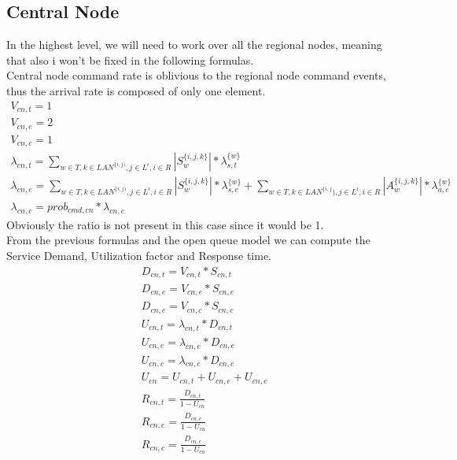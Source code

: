 \documentclass[11pt]{article}
\begin{document}
\subsection{Central Node}
In the highest level, we will need to work over all the regional nodes, meaning that also i won't be fixed in the following formulas.\\
Central node command rate is oblivious to the regional node command events, thus the arrival rate is composed of only one element.
\begin{equation}
	\begin{array}{l}
		V_{cn, t} = 1 \\
		V_{cn, e} = 2 \\ %
		V_{cn,c} = 1 \\
        \lambda_{cn, t} = \sum\limits_{w \in T,k \in LAN^{\{i,j)},j \in L^i, i \in R}{| S^{\{i,j,k\}}_{w} | * \lambda^{\{w\}}_{s, t}}  \\
        \lambda_{cn, e} = \sum\limits_{w \in T,k \in LAN^{\{i,j)},j \in L^i, i \in R}{| S^{\{i,j,k\}}_{w} | * \lambda^{\{w\}}_{s, e}} + \sum\limits_{w \in T,k \in LAN^{\{i,j}),j \in L^i, i \in R}{| A^{\{i,j,k\}}_{w} | * \lambda^{\{w\}}_{a, e}}\\
		\lambda_{cn, c} = prob_{cmd,cn} * \lambda_{cn, c}
	\end{array}
\end{equation}
Obviously the ratio is not present in this case since it would be 1.\\
From the previous formulas and the open queue model we can compute the Service Demand, Utilization factor and Response time.
\begin{equation}
	\begin{array}{l}
		D_{cn, t} = V_{cn, t} * S_{cn, t} \\
		D_{cn, e} = V_{cn, e} * S_{cn, e} \\
		D_{cn, c} = V_{cn, c} * S_{cn, c} \\
		U_{cn, t} = \lambda_{cn, t} * D_{cn, t} \\
		U_{cn, e} = \lambda_{cn, e} * D_{cn, e} \\
		U_{cn, c} = \lambda_{cn, c} * D_{cn, c} \\
		U_{cn} = U_{cn, t} + U_{cn, e} + U_{cn, c} \\
		R_{cn, t} = \frac{D_{cn, t}}{1 - U_{cn}} \\
		R_{cn, e} = \frac{D_{cn, e}}{1 - U_{cn}} \\
		R_{cn, c} = \frac{D_{cn, c}}{1 - U_{cn}} \\
	\end{array}
\end{equation}
\end{document}
